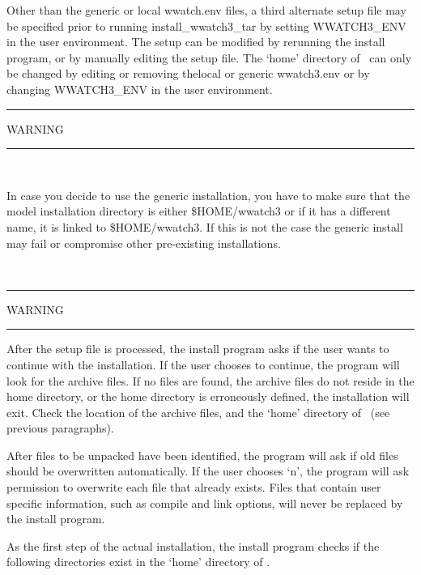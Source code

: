 Other than the generic or local wwatch.env files, a third alternate
setup file may be specified prior to running {\file install\_wwatch3\_tar} by
setting {\code WWATCH3\_ENV} in the user environment.  The setup can be
modified by rerunning the install program, or by manually editing the setup
file. The `home' directory of \ws\ can only be changed by editing or removing
thelocal or generic {\file wwatch3.env} or by changing {\code WWATCH3\_ENV} in the user
environment.

\begin{center}
\rule[1mm]{55mm}{1.0mm} WARNING \rule[1mm]{55mm}{1.0mm} \\ 
\vspace{\baselineskip}

\parbox{120mm}{In case you decide to use the generic installation, you have to make sure
that the model installation directory is either {\file \${HOME}/wwatch3} or if it has
a different name, it is linked to {\file \${HOME}/wwatch3}. If this is not the case
the generic install may fail or compromise other pre-existing installations.}
\\ \vspace{\baselineskip} \rule[1mm]{55mm}{1.0mm}
WARNING \rule[1mm]{55mm}{1.0mm}
\end{center}

After the setup file is processed, the install program asks if the user wants
to continue with the installation. If the user chooses to continue, the
program will look for the archive files. If no files are found, the
archive files do not reside in the home directory, or the home directory is
erroneously defined, the installation will exit. 
Check the location of the archive files, and the `home' directory of \ws\
(see previous paragraphs).

After files to be unpacked have been identified, the program will ask if old
files should be overwritten automatically. If the user chooses `n', the
program will ask permission to overwrite each file that already exists. Files
that contain user specific information, such as compile and link options, will
never be replaced by the install program.

As the first step of the actual installation, the install program checks if
the following directories exist in the `home' directory of \ws.
 
\begin{dlist}
\dit{exe }{\ws\ executables.}
\end{dlist}

